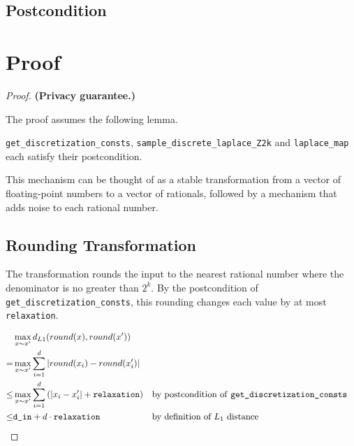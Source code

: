 \documentclass{article}
\begin{document}
\subsection*{Postcondition}


\section{Proof}

\begin{proof} 
\textbf{(Privacy guarantee.)} 
    
\begin{tcolorbox}
    The proof assumes the following lemma.
    \begin{lemma}
        \texttt{get\_discretization\_consts}, \texttt{sample\_discrete\_laplace\_Z2k} and \texttt{laplace\_map} each satisfy their postcondition.
    \end{lemma}
\end{tcolorbox}

This mechanism can be thought of as a stable transformation from a vector of floating-point numbers to a vector of rationals,
followed by a mechanism that adds noise to each rational number.

\subsection{Rounding Transformation}

The transformation rounds the input to the nearest rational number where the denominator is no greater than $2^k$.
By the postcondition of \texttt{get\_discretization\_consts}, this rounding changes each value by at most \texttt{relaxation}.

\begin{align*}
    &\max_{x \sim x'} d_{L1}(round(x), round(x')) \\
    =& \max_{x \sim x'} \sum_{i=1}^d \left| round(x_i) - round(x'_i) \right| \\
    \leq& \max_{x \sim x'} \sum_{i=1}^d \left(\left| x_i - x'_i \right| + \texttt{relaxation} \right) &&\text{by postcondition of \texttt{get\_discretization\_consts}} \\
    \leq& \texttt{d\_in} + d \cdot \texttt{relaxation} &&\text{by definition of } L_1 \text{ distance}
\end{align*}


\end{proof}
\end{document}
